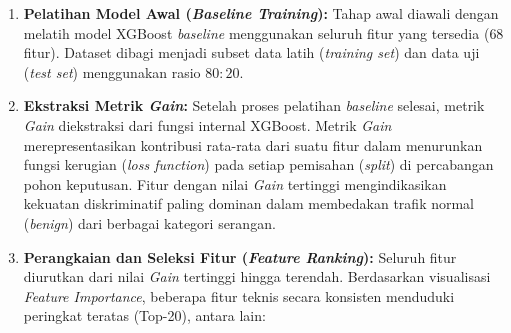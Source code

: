 \documentclass[11pt, a4paper]{article}
\begin{document}
\begin{enumerate}
    \item \textbf{Pelatihan Model Awal (\textit{Baseline Training}):} Tahap awal diawali dengan melatih model XGBoost \textit{baseline} menggunakan seluruh fitur yang tersedia ($68$ fitur). Dataset dibagi menjadi subset data latih (\textit{training set}) dan data uji (\textit{test set}) menggunakan rasio $80:20$.
    
    \item \textbf{Ekstraksi Metrik \textit{Gain}:} Setelah proses pelatihan \textit{baseline} selesai, metrik \textit{Gain} diekstraksi dari fungsi internal XGBoost. Metrik \textit{Gain} merepresentasikan kontribusi rata-rata dari suatu fitur dalam menurunkan fungsi kerugian (\textit{loss function}) pada setiap pemisahan (\textit{split}) di percabangan pohon keputusan. Fitur dengan nilai \textit{Gain} tertinggi mengindikasikan kekuatan diskriminatif paling dominan dalam membedakan trafik normal (\textit{benign}) dari berbagai kategori serangan.
    
    \item \textbf{Perangkaian dan Seleksi Fitur (\textit{Feature Ranking}):} Seluruh fitur diurutkan dari nilai \textit{Gain} tertinggi hingga terendah. Berdasarkan visualisasi \textit{Feature Importance}, beberapa fitur teknis secara konsisten menduduki peringkat teratas (Top-20), antara lain:


\end{enumerate}
\end{document}
